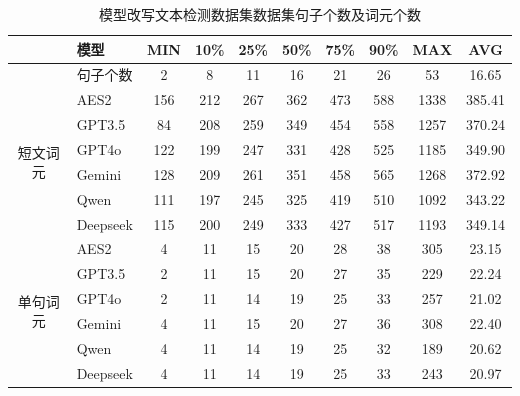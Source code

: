 \begin{table}[htb]
\centering

\caption{模型改写文本检测数据集数据集句子个数及词元个数}
\begin{tabular}{c|l|cccccccc}
\toprule
                          & \textbf{模型}  & \textbf{MIN} & \textbf{10\%} & \textbf{25\%} & \textbf{50\%} & \textbf{75\%} & \textbf{90\%} & \textbf{MAX}  & \textbf{AVG}   \\
    \midrule
                          & 句子个数        & 2   & 8    & 11   & 16   & 21   & 26   & 53   & 16.65  \\ \midrule
\multirow{6}{*}{短文词元} & AES2 \cite{learning-agency-lab-automated-essay-scoring-2}           & 156 & 212  & 267  & 362  & 473  & 588  & 1338 & 385.41 \\
                          & GPT3.5 \cite{chatgpt}         & 84  & 208  & 259  & 349  & 454  & 558  & 1257 & 370.24 \\
                          & GPT4o \cite{gpt4o}          & 122 & 199  & 247  & 331  & 428  & 525  & 1185 & 349.90 \\
                          & Gemini \cite{geminiteam2024geminifamilyhighlycapable}         & 128 & 209  & 261  & 351  & 458  & 565  & 1268 & 372.92 \\
                          & Qwen \cite{qwen2025qwen25technicalreport}           & 111 & 197  & 245  & 325  & 419  & 510  & 1092 & 343.22 \\
                          & Deepseek \cite{deepseekai2024deepseekv3technicalreport}       & 115 & 200  & 249  & 333  & 427  & 517  & 1193 & 349.14 \\
                          \midrule
\multirow{6}{*}{单句词元} & AES2 \cite{learning-agency-lab-automated-essay-scoring-2}           & 4   & 11   & 15   & 20   & 28   & 38   & 305  & 23.15  \\
                          & GPT3.5 \cite{chatgpt}         & 2   & 11   & 15   & 20   & 27   & 35   & 229  & 22.24  \\
                          & GPT4o \cite{gpt4o}          & 2   & 11   & 14   & 19   & 25   & 33   & 257  & 21.02  \\
                          & Gemini \cite{geminiteam2024geminifamilyhighlycapable}         & 4   & 11   & 15   & 20   & 27   & 36   & 308  & 22.40  \\
                          & Qwen \cite{qwen2025qwen25technicalreport}           & 4   & 11   & 14   & 19   & 25   & 32   & 189  & 20.62  \\
                          & Deepseek \cite{deepseekai2024deepseekv3technicalreport}       & 4   & 11   & 14   & 19   & 25   & 33   & 243  & 20.97 \\
                          \bottomrule
\end{tabular}

\label{tab:TOSWT-length}

\end{table}

